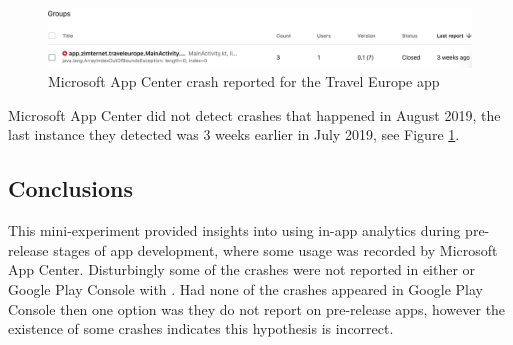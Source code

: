 \begin{figure}[htbp]
    \centering
    \includegraphics[width=\linewidth]{images/microsoft-app-center/AppCenter_crash_reported_in_test_app_2019_aug_07.png}
    \caption{Microsoft App Center crash reported for the Travel Europe app}
    \label{fig:appcenter_crash_report}
\end{figure}

Microsoft App Center did not detect crashes that happened in August 2019, the last instance they detected was 3 weeks earlier in July 2019, see Figure \ref{fig:appcenter_crash_report}.

\subsection{Conclusions}
This mini-experiment provided insights into using in-app analytics during pre-release stages of app development, where some usage was recorded by Microsoft App Center. Disturbingly some of the crashes were not reported in either  or Google Play Console with . Had none of the crashes appeared in Google Play Console then one option was they do not report on pre-release apps, however the existence of some crashes indicates this hypothesis is incorrect.